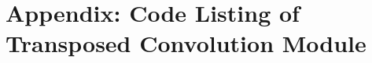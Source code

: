 
\chapter{Appendix: Code Listing of Transposed Convolution Module}\label{appx:verilog_listing}

\begin{code}
  \begin{verbatim}
  
  \end{verbatim}
  \label{code:transposed_convolution}
\end{code}

\clearpage %
